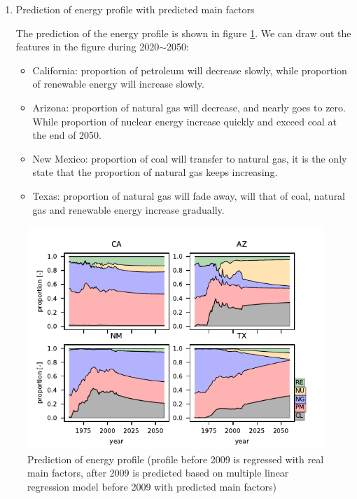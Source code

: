 \begin{enumerate}
    \item{Prediction of energy profile with predicted main factors}\par
    The prediction of the energy profile is shown in figure \ref{fig: energy profile prediction}. We can draw out the features in the figure during 2020$\sim$2050:
    \begin{itemize}
        \item California: proportion of petroleum will decrease slowly, while proportion of renewable energy will increase slowly.
        \item Arizona: proportion of natural gas will decrease, and nearly goes to zero. While proportion of nuclear energy increase quickly and exceed coal at the end of 2050.
        \item New Mexico: proportion of coal will transfer to natural gas, it is the only state that the proportion of natural gas keeps increasing.
        \item Texas: proportion of natural gas will fade away, will that of coal, natural gas  and renewable energy increase gradually.
    \end{itemize}
\end{enumerate}
\begin{figure}[H] 
    \centering 
    \includegraphics[width=0.5\linewidth]{fig/proportion_Prediction.pdf}
    \caption{Prediction of energy profile (profile before 2009 is regressed with real main factors, after 2009 is predicted based on multiple linear regression model before 2009 with predicted main factors)}
    \label{fig: energy profile prediction}
\end{figure}